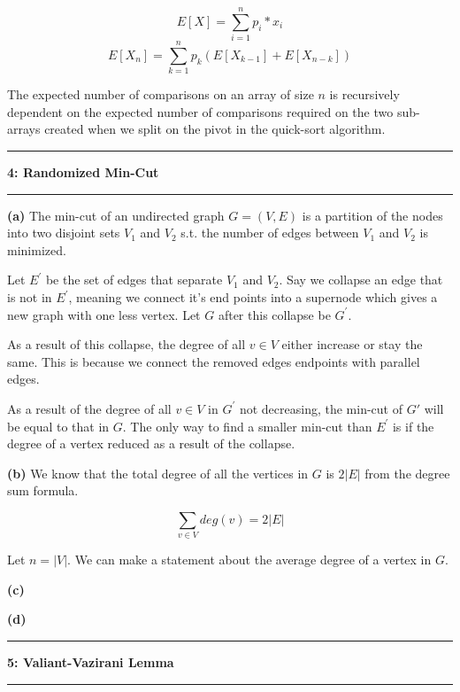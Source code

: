 \documentclass[11pt]{article}
\newcommand\question[2]{\vspace{.25in}\hrule\textbf{#1: #2}\vspace{.5em}\hrule\vspace{.10in}}
\renewcommand\part[1]{\vspace{.10in}\textbf{(#1)}}
\begin{document}
$$E[X] = \sum_{i = 1}^n p_i * x_i$$
$$E[X_n] = \sum_{k = 1}^n p_k(E[X_{k-1}] + E[X_{n-k}])$$

The expected number of comparisons on an array of size $n$ is recursively dependent on the expected number of comparisons required on the two sub-arrays created when we split on the pivot in the quick-sort algorithm.

\question{4}{Randomized Min-Cut}

\part{a} The min-cut of an undirected graph $G = (V, E)$ is a partition of the nodes into two disjoint sets $V_1$ and $V_2$ s.t. the number of edges between $V_1$ and $V_2$ is minimized.

Let $E^\prime$ be the set of edges that separate $V_1$ and $V_2$. Say we collapse an edge that is not in $E^\prime$, meaning we connect it's end points into a supernode which gives a new graph with one less vertex. Let $G$ after this collapse be $G^\prime$.

As a result of this collapse, the degree of all $v \in V$ either increase or stay the same. This is because we connect the removed edges endpoints with parallel edges.

As a result of the degree of all $v \in V$ in $G^\prime$ not decreasing, the min-cut of $G'$ will be equal to that in $G$. The only way to find a smaller min-cut than $E^\prime$ is if the degree of a vertex reduced as a result of the collapse.

\part{b} We know that the total degree of all the vertices in $G$ is $2|E|$ from the degree sum formula.

$$\sum_{v \in V} deg(v) = 2|E|$$

Let $n = |V|$. We can make a statement about the average degree of a vertex in $G$. 

\part{c}

\part{d}

\question{5}{Valiant-Vazirani Lemma}
\end{document}
